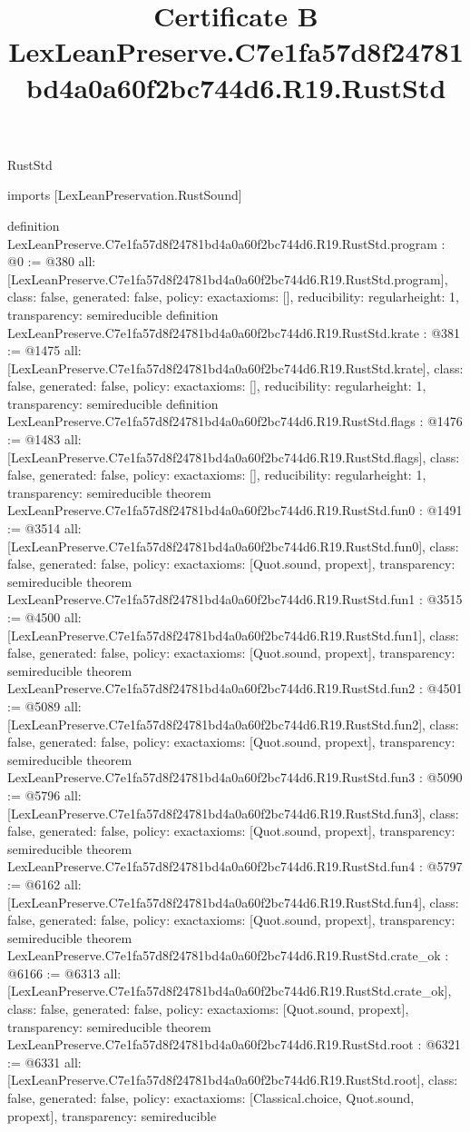 \begin{lexlean}{RustStd}
\title{Certificate B LexLeanPreserve.C7e1fa57d8f24781bd4a0a60f2bc744d6.R19.RustStd}
\begin{coremodule}
imports [LexLeanPreservation.RustSound]

definition LexLeanPreserve.C7e1fa57d8f24781bd4a0a60f2bc744d6.R19.RustStd.program : @0 := @380 {
  all: [LexLeanPreserve.C7e1fa57d8f24781bd4a0a60f2bc744d6.R19.RustStd.program],
  class: false,
  generated: false,
  policy: exact{axioms: []},
  reducibility: regular{height: 1},
  transparency: semireducible
}
definition LexLeanPreserve.C7e1fa57d8f24781bd4a0a60f2bc744d6.R19.RustStd.krate : @381 := @1475 {
  all: [LexLeanPreserve.C7e1fa57d8f24781bd4a0a60f2bc744d6.R19.RustStd.krate],
  class: false,
  generated: false,
  policy: exact{axioms: []},
  reducibility: regular{height: 1},
  transparency: semireducible
}
definition LexLeanPreserve.C7e1fa57d8f24781bd4a0a60f2bc744d6.R19.RustStd.flags : @1476 := @1483 {
  all: [LexLeanPreserve.C7e1fa57d8f24781bd4a0a60f2bc744d6.R19.RustStd.flags],
  class: false,
  generated: false,
  policy: exact{axioms: []},
  reducibility: regular{height: 1},
  transparency: semireducible
}
theorem LexLeanPreserve.C7e1fa57d8f24781bd4a0a60f2bc744d6.R19.RustStd.fun0 : @1491 := @3514 {
  all: [LexLeanPreserve.C7e1fa57d8f24781bd4a0a60f2bc744d6.R19.RustStd.fun0],
  class: false,
  generated: false,
  policy: exact{axioms: [Quot.sound, propext]},
  transparency: semireducible
}
theorem LexLeanPreserve.C7e1fa57d8f24781bd4a0a60f2bc744d6.R19.RustStd.fun1 : @3515 := @4500 {
  all: [LexLeanPreserve.C7e1fa57d8f24781bd4a0a60f2bc744d6.R19.RustStd.fun1],
  class: false,
  generated: false,
  policy: exact{axioms: [Quot.sound, propext]},
  transparency: semireducible
}
theorem LexLeanPreserve.C7e1fa57d8f24781bd4a0a60f2bc744d6.R19.RustStd.fun2 : @4501 := @5089 {
  all: [LexLeanPreserve.C7e1fa57d8f24781bd4a0a60f2bc744d6.R19.RustStd.fun2],
  class: false,
  generated: false,
  policy: exact{axioms: [Quot.sound, propext]},
  transparency: semireducible
}
theorem LexLeanPreserve.C7e1fa57d8f24781bd4a0a60f2bc744d6.R19.RustStd.fun3 : @5090 := @5796 {
  all: [LexLeanPreserve.C7e1fa57d8f24781bd4a0a60f2bc744d6.R19.RustStd.fun3],
  class: false,
  generated: false,
  policy: exact{axioms: [Quot.sound, propext]},
  transparency: semireducible
}
theorem LexLeanPreserve.C7e1fa57d8f24781bd4a0a60f2bc744d6.R19.RustStd.fun4 : @5797 := @6162 {
  all: [LexLeanPreserve.C7e1fa57d8f24781bd4a0a60f2bc744d6.R19.RustStd.fun4],
  class: false,
  generated: false,
  policy: exact{axioms: [Quot.sound, propext]},
  transparency: semireducible
}
theorem LexLeanPreserve.C7e1fa57d8f24781bd4a0a60f2bc744d6.R19.RustStd.crate_ok : @6166 := @6313 {
  all: [LexLeanPreserve.C7e1fa57d8f24781bd4a0a60f2bc744d6.R19.RustStd.crate_ok],
  class: false,
  generated: false,
  policy: exact{axioms: [Quot.sound, propext]},
  transparency: semireducible
}
theorem LexLeanPreserve.C7e1fa57d8f24781bd4a0a60f2bc744d6.R19.RustStd.root : @6321 := @6331 {
  all: [LexLeanPreserve.C7e1fa57d8f24781bd4a0a60f2bc744d6.R19.RustStd.root],
  class: false,
  generated: false,
  policy: exact{axioms: [Classical.choice, Quot.sound, propext]},
  transparency: semireducible
}


\end{coremodule}
\end{lexlean}
